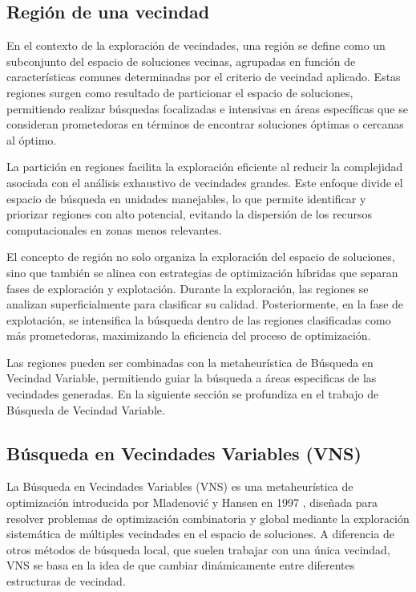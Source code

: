 \documentclass{article}
\begin{document}
\subsection{Región de una vecindad}
En el contexto de la exploración de vecindades, una región se define como un subconjunto del espacio de soluciones vecinas, agrupadas en función de características comunes determinadas por el criterio de vecindad aplicado. Estas regiones surgen como resultado de particionar el espacio de soluciones, permitiendo realizar búsquedas focalizadas e intensivas en áreas específicas que se consideran prometedoras en términos de encontrar soluciones óptimas o cercanas al óptimo.

La partición en regiones facilita la exploración eficiente al reducir la complejidad asociada con el análisis exhaustivo de vecindades grandes. Este enfoque divide el espacio de búsqueda en unidades manejables, lo que permite identificar y priorizar regiones con alto potencial, evitando la dispersión de los recursos computacionales en zonas menos relevantes. 

El concepto de región no solo organiza la exploración del espacio de soluciones, sino que también se alinea con estrategias de optimización híbridas que separan fases de exploración y explotación. Durante la exploración, las regiones se analizan superficialmente para clasificar su calidad. Posteriormente, en la fase de explotación, se intensifica la búsqueda dentro de las regiones clasificadas como más prometedoras, maximizando la eficiencia del proceso de optimización.

Las regiones pueden ser combinadas con la metaheurística de Búsqueda en Vecindad Variable, permitiendo guiar la búsqueda a áreas especificas de las vecindades generadas. En la siguiente sección se profundiza en el trabajo de Búsqueda de Vecindad Variable.

\subsection{Búsqueda en Vecindades Variables (VNS)}

La Búsqueda en Vecindades Variables (VNS) es una metaheurística de optimización introducida por Mladenović y Hansen en 1997 \cite{ref12}, diseñada para resolver problemas de optimización combinatoria y global mediante la exploración sistemática de múltiples vecindades en el espacio de soluciones. A diferencia de otros métodos de búsqueda local, que suelen trabajar con una única vecindad, VNS se basa en la idea de que cambiar dinámicamente entre diferentes estructuras de vecindad. 
\end{document}
